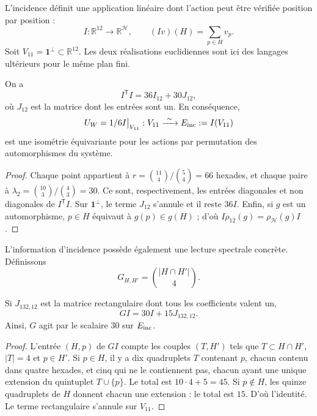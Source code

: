 L'incidence définit une application linéaire dont l'action peut être vérifiée
position par position :
\begin{equation}
 I:\mathbb R^{12}\longrightarrow\mathbb R^{\mathcal H},
 \qquad (Iv)(H)=\sum_{p\in H}v_p.
 \label{x_reciprocidad:exc:incidencia}
\end{equation}
Soit $V_{11}=\mathbf1^\perp\subset\mathbb R^{12}$. Les deux réalisations
euclidiennes sont ici des langages ultérieurs pour le même plan fini.

\begin{proposition}
\label{x_reciprocidad:exc:isometria}
On a
\[
 I^{\mathsf T}I=36I_{12}+30J_{12},
\]
où $J_{12}$ est la matrice dont les entrées sont un. En conséquence,
\[
 U_W=\frac16 I\big|_{V_{11}}:
 V_{11}\xrightarrow{\ \sim\ }E_{\rm inc}:=I(V_{11})
\]
est une isométrie équivariante pour les actions par permutation des
automorphismes du système.
\end{proposition}

\begin{proof}
Chaque point appartient à
$r=\binom{11}{4}/\binom54=66$ hexades, et chaque paire à
$\lambda_2=\binom{10}{3}/\binom43=30$. Ce sont, respectivement, les
entrées diagonales et non diagonales de $I^{\mathsf T}I$. Sur
$\mathbf1^\perp$, le terme $J_{12}$ s'annule et il reste $36I$.
Enfin, si $g$ est un automorphisme, $p\in H$ équivaut à
$g(p)\in g(H)$ ; d'où $I\rho_{12}(g)=\rho_{\mathcal H}(g)I$.
\end{proof}

L'information d'incidence possède également une lecture spectrale concrète. Définissons
\[
 G_{H,H'}=\binom{|H\cap H'|}{4}.
\]

\begin{lemma}
\label{x_reciprocidad:exc:espectro}
Si $J_{132,12}$ est la matrice rectangulaire dont tous les coefficients valent un,
\[
 GI=30I+15J_{132,12}.
\]
Ainsi, $G$ agit par le scalaire $30$ sur $E_{\rm inc}$.
\end{lemma}

\begin{proof}
L'entrée $(H,p)$ de $GI$ compte les couples $(T,H')$ tels que
$T\subset H\cap H'$, $|T|=4$ et $p\in H'$. Si $p\in H$, il y a dix
quadruplets $T$ contenant $p$, chacun contenu dans quatre hexades,
et cinq qui ne le contiennent pas, chacun ayant une unique extension du
quintuplet $T\cup\{p\}$. Le total est $10\cdot4+5=45$.
Si $p\notin H$, les quinze quadruplets de $H$ donnent chacun une
extension : le total est $15$. D'où l'identité. Le terme rectangulaire
s'annule sur $V_{11}$.
\end{proof}


